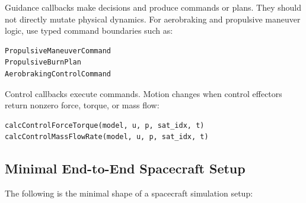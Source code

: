 \documentclass[11pt]{article}
\begin{document}
Guidance callbacks make decisions and produce commands or plans. They should
not directly mutate physical dynamics. For aerobraking and propulsive maneuver
logic, use typed command boundaries such as:

\begin{lstlisting}
PropulsiveManeuverCommand
PropulsiveBurnPlan
AerobrakingControlCommand
\end{lstlisting}

Control callbacks execute commands. Motion changes when control effectors
return nonzero force, torque, or mass flow:

\begin{lstlisting}
calcControlForceTorque(model, u, p, sat_idx, t)
calcControlMassFlowRate(model, u, p, sat_idx, t)
\end{lstlisting}

\subsection{Minimal End-to-End Spacecraft Setup}

The following is the minimal shape of a spacecraft simulation setup:
\end{document}
